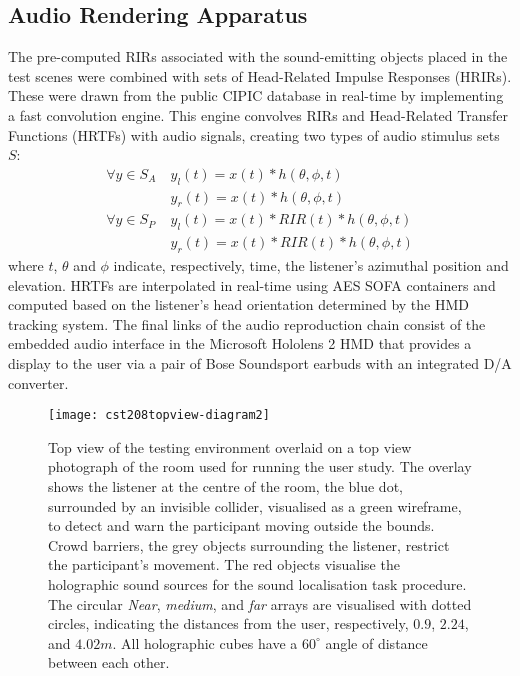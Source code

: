 \subsection{Audio Rendering Apparatus}\label{sec:audio-apparatus}
The pre-computed RIRs associated with the sound-emitting objects placed in the test scenes were combined with sets of Head-Related Impulse Responses (HRIRs). These were drawn from the public CIPIC database in real-time by implementing a fast convolution engine. This engine convolves RIRs and Head-Related Transfer Functions (HRTFs) with audio signals, creating two types of audio stimulus sets $S$: 
\begin{align}
     \forall y \in S_{A}\ & y_l(t) = x(t) * h(\theta, \phi, t)\\
     & y_r(t) = x(t) * h(\theta, \phi, t) \\
     \forall y \in S_{P}\ & y_l(t) = x(t) * RIR(t) * h(\theta, \phi, t) \\
     & y_r(t) = x(t) * RIR(t) * h(\theta, \phi, t)
\end{align}
where $t$, $\theta$ and $\phi$ indicate, respectively, time, the listener's azimuthal position and elevation. HRTFs are interpolated in real-time using AES SOFA containers \cite{hoene2017mysofa} and computed based on the listener's head orientation determined by the HMD tracking system. The final links of the audio reproduction chain consist of the embedded audio interface in the Microsoft Hololens 2 HMD that provides a display to the user via a pair of Bose Soundsport earbuds with an integrated D/A converter.\par
\begin{figure}[htbp]
    \centering
    \texttt{[image: cst208topview-diagram2]}
    \caption[Psychoacoustic testing diagram --- top view]{Top view of the testing environment overlaid on a top view photograph of the room used for running the user study. The overlay shows the listener at the centre of the room, the blue dot, surrounded by an invisible collider, visualised as a green wireframe, to detect and warn the participant moving outside the bounds. Crowd barriers, the grey objects surrounding the listener, restrict the participant's movement. The red objects visualise the holographic sound sources for the sound localisation task procedure. The circular \emph{Near}, \emph{medium}, and \emph{far} arrays are visualised with dotted circles, indicating the distances from the user, respectively, $0.9$, $2.24$, and $4.02m$. All holographic cubes have a $60^\circ$ angle of distance between each other.}\label{fig:psycho-top-view}
\end{figure}

